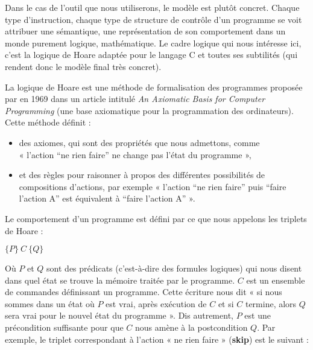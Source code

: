 Dans le cas de l'outil que nous utiliserons, le modèle est plutôt concret.
Chaque type d'instruction, chaque type de structure de contrôle d'un programme
se voit attribuer une sémantique, une représentation de son comportement dans
un monde purement logique, mathématique. Le cadre logique qui nous intéresse
ici, c'est la logique de Hoare adaptée pour le langage C et toutes ses
subtilités (qui rendent donc le modèle final très concret).








La logique de Hoare est une méthode de formalisation des programmes proposée
par 
en 1969 dans un article intitulé \textit{An Axiomatic Basis for
Computer Programming} (une base axiomatique pour la programmation des
ordinateurs). Cette méthode définit :



\begin{itemize}
\item des axiomes, qui sont des propriétés que nous admettons, comme \\
« l'action “ne rien faire” ne change pas l'état du programme »,
\item et des règles pour raisonner à propos des différentes possibilités de
compositions d'actions, par exemple « l'action “ne rien faire” puis “faire
l'action A” est équivalent à “faire l'action A” ».
\end{itemize}


Le comportement d'un programme est défini par ce que nous appelons les triplets
de Hoare :




\begin{center}
$\{P\}\ C\ \{Q\}$
\end{center}


Où $P$ et $Q$ sont des prédicats (c'est-à-dire des formules logiques) qui nous disent dans
quel état se trouve la mémoire traitée par le programme. $C$ est un ensemble de
commandes définissant un programme. Cette écriture nous dit « si nous sommes
dans un état où $P$ est vrai, après exécution de $C$ et si $C$ termine,
alors $Q$ sera vrai pour le nouvel état du programme ». Dis autrement, $P$ est
une précondition suffisante pour que $C$ nous amène à la postcondition $Q$.
Par exemple, le triplet correspondant à l'action « ne rien faire » (\textbf{skip})
est le suivant :




